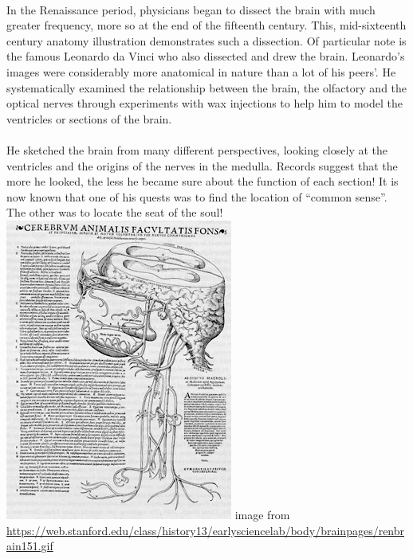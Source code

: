 \documentclass[12pt,a4paper]{article}
\begin{document}
\paragraph{}
In the Renaissance period, physicians began to dissect the brain with much greater frequency, more so at the end of the fifteenth century. This, mid-sixteenth century anatomy illustration demonstrates such a dissection. Of particular note is the famous Leonardo da Vinci who also dissected and drew the brain.  Leonardo's images were considerably more anatomical in nature than a lot of his peers’. He systematically examined the relationship between the brain, the olfactory and the optical nerves through experiments with wax injections to help him to model the ventricles or sections of the brain.  
\paragraph{}
He sketched the brain from many different perspectives, looking closely at the ventricles and the origins of the nerves in the medulla.  Records suggest that the more he looked, the less he became sure about the function of each section! It is now known that one of his quests was to find the location of “common sense”.  The other was to locate the seat of the soul!\newline \newline
\includegraphics[scale=1]{renbrain151.jpg} \newline
image from \url{https://web.stanford.edu/class/history13/earlysciencelab/body/brainpages/renbrain151.gif}\newline
\end{document}
